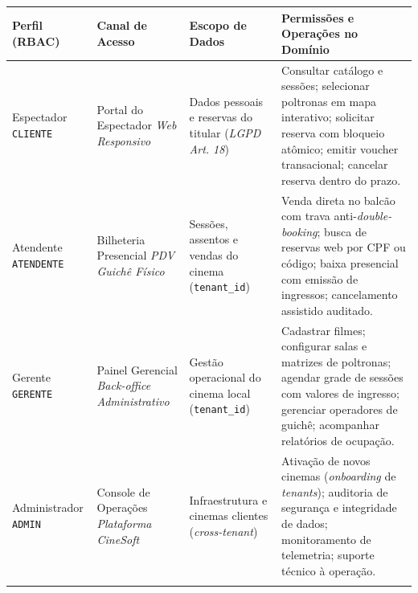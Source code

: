 {\footnotesize
\begin{tabularx}{\textwidth}{>{\fontSemiBold\color{BrandNavy}\arraybackslash}L{2.4cm} >{\arraybackslash}L{3.0cm} >{\arraybackslash}L{3.0cm} Y}
\toprule
{}
\textbf{Perfil (RBAC)} & \textbf{Canal de Acesso} & \textbf{Escopo de Dados} & \textbf{Permissões e Operações no Domínio} \\
\midrule
{}
Espectador \newline\texttt{\scriptsize CLIENTE} & Portal do Espectador \newline\emph{\scriptsize Web Responsivo} & Dados pessoais e reservas do titular (\emph{\scriptsize LGPD Art. 18}) & Consultar catálogo e sessões; selecionar poltronas em mapa interativo; solicitar reserva com bloqueio atômico; emitir voucher transacional; cancelar reserva dentro do prazo. \\
\midrule
Atendente \newline\texttt{\scriptsize ATENDENTE} & Bilheteria Presencial \newline\emph{\scriptsize PDV Guichê Físico} & Sessões, assentos e vendas do cinema (\texttt{\scriptsize tenant\_id}) & Venda direta no balcão com trava anti-\emph{double-booking}; busca de reservas web por CPF ou código; baixa presencial com emissão de ingressos; cancelamento assistido auditado. \\
\midrule
Gerente \newline\texttt{\scriptsize GERENTE} & Painel Gerencial \newline\emph{\scriptsize Back-office Administrativo} & Gestão operacional do cinema local (\texttt{\scriptsize tenant\_id}) & Cadastrar filmes; configurar salas e matrizes de poltronas; agendar grade de sessões com valores de ingresso; gerenciar operadores de guichê; acompanhar relatórios de ocupação. \\
\midrule
Administrador \newline\texttt{\scriptsize ADMIN} & Console de Operações \newline\emph{\scriptsize Plataforma CineSoft} & Infraestrutura e cinemas clientes (\emph{\scriptsize cross-tenant}) & Ativação de novos cinemas (\emph{onboarding} de \emph{tenants}); auditoria de segurança e integridade de dados; monitoramento de telemetria; suporte técnico à operação. \\
\bottomrule
\end{tabularx}
}

